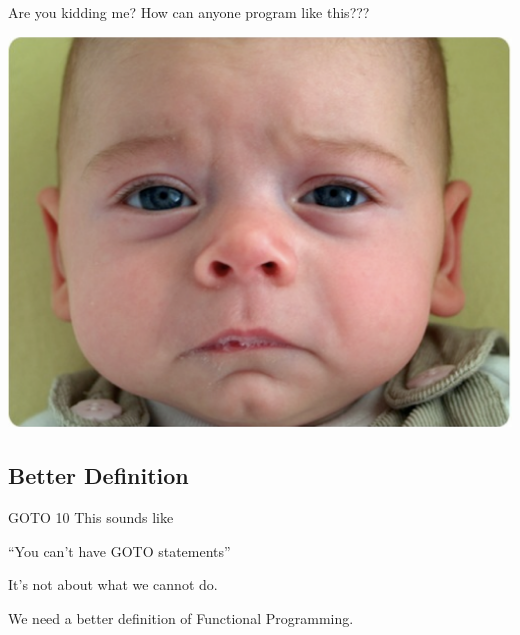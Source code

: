 \documentclass[mathserif]{beamer}
\begin{document}
\begin{frame}{Are you kidding me?}
  How can anyone program like this???
  \begin{center}
    \includegraphics[scale=0.3]{img/sadbaby.png}
  \end{center}
\end{frame}

\subsection{Better Definition}

\begin{frame}{GOTO 10}
    This sounds like
  \begin{exampleblock}{}
    {\Large ``You can't have GOTO statements''}
  \end{exampleblock}
  \vskip5mm
  \hspace*{}
\end{frame}

\begin{frame}{}

  \begin{center}
    {\Huge It's not about what we cannot do.}
  \end{center}

\end{frame}

\begin{frame}{}

  \begin{center}
    {\Huge We need a better definition of Functional Programming.}
  \end{center}

\end{frame}
\end{document}
